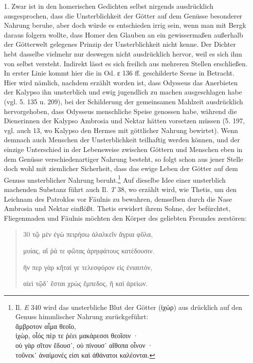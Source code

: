 \documentclass[a4paper, 11pt, oneside]{article}
\begin{document}
1. Zwar ist in den homerischen Gedichten selbst nirgends ausdrücklich ausgesprochen, dass die Unsterblichkeit der Götter auf dem Genüsse besonderer Nahrung beruhe, aber doch würde es entschieden irrig sein, wenn man mit Bergk daraus folgern wollte, dass Homer den Glauben an ein gewissermaßen außerhalb der Götterwelt gelegenes Prinzip der Unsterblichkeit nicht kenne. Der Dichter hebt dasselbe vielmehr nur deswegen nicht ausdrücklich hervor, weil es sich ihm von selbst versteht. Indirekt lässt es sich freilich aus mehreren Stellen erschließen. In erster Linie kommt hier die in Od. ε 136 ff. geschilderte Scene in Betracht. Hier wird nämlich, nachdem erzählt worden ist, dass Odysseus das Anerbieten der Kalypso ihn unsterblich und ewig jugendlich zu machen ausgeschlagen habe (vgl. 5. 135 u. 209), bei der Schilderung der gemeinsamen Mahlzeit ausdrücklich hervorgehoben, dass Odysseus menschliche Speise genossen habe, während die Dienerinnen der Kalypso Ambrosia und Nektar hätten vorsetzen müssen (5. 197, vgl. auch 13, wo Kalypso den Hermes mit göttlicher Nahrung bewirtet). Wenn demnach auch Menschen der Unsterblichkeit teilhaftig werden können, und der einzige Unterschied in der Lebensweise zwischen Göttern und Menschen eben in dem Genüsse verschiedenartiger Nahrung besteht, so folgt schon aus jener Stelle doch wohl mit ziemlicher Sicherheit, dass das ewige Leben der Götter auf dem Genuss unsterblicher Nahrung beruht.\footnote{Il. \emph{E} 340 wird das unsterbliche Blut der Götter (ἰχώρ) aus drücklich auf den Genuss himmlischer Nahrung zurückgeführt:\\\hspace*{15mm}ἄμβροτον αἷμα θεοῖο,\\\hspace*{5mm}ἰχὼρ, οἷός πὲρ τε ῥέει μακάρεσσι θεοῖσιν ·\\\hspace*{5mm}οὐ γὰρ σῖτον ἔδουσ᾽, οὐ πίνουσ᾽ αἴθοπα οἷνον ·\\\hspace*{5mm}τοὔνεκ᾽ ἀναίμονές εἰσι καὶ ἀθάνατοι καλέονται.} Auf dieselbe Idee einer unsterblich machenden Substanz führt auch Il. \emph{T} 38, wo erzählt wird, wie Thetis, um den Leichnam des Patroklos vor Fäulnis zu bewahren, demselben durch die Nase Ambrosia und Nektar einflößt. Thetis erwidert ihrem Sohne, der befürchtet, Fliegenmaden und Fäulnis möchten den Körper des geliebten Freundes zerstören:
\begin{quotation}\large
30 τῷ μὲν ἐγὼ πειρήσω ἀλαλκεῖν ἄγρια φῦλα,

μυίας, αἵ ῥά τε φῶτας ἀρηιφάτους κατέδουσιν.

ἤν περ γὰρ κῆταί γε τελεσφόρον εἰς ἐνιαυτόν,

αἰεὶ τῷδ᾽ ἔσται χρὼς ἔμπεδος, ἢ καὶ ἀρείων.
\end{quotation}
\end{document}
